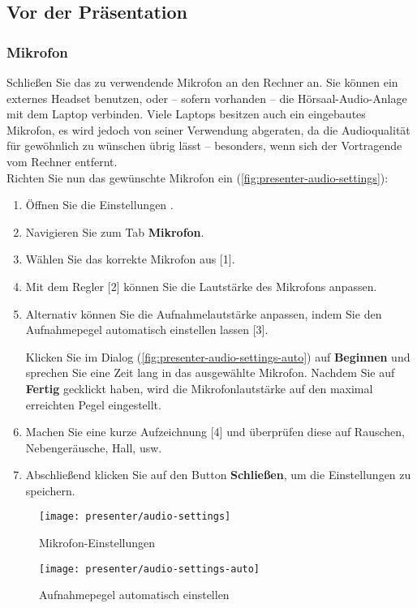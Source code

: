 \subsection*{Vor der Präsentation}

\subsubsection{Mikrofon}
Schließen Sie das zu verwendende Mikrofon an den Rechner an. Sie können ein externes Headset benutzen, oder -- sofern vorhanden -- die Hörsaal-Audio-Anlage mit dem Laptop verbinden.
Viele Laptops besitzen auch ein eingebautes Mikrofon, es wird jedoch von seiner Verwendung abgeraten, da die Audioqualität für gewöhnlich zu wünschen übrig lässt -- besonders, wenn sich der Vortragende vom Rechner entfernt.
\\
Richten Sie nun das gewünschte Mikrofon ein (\autoref{fig:presenter-audio-settings}):
\begin{enumerate}
	\item Öffnen Sie die Einstellungen .
	\item Navigieren Sie zum Tab \textbf{Mikrofon}.
	\item Wählen Sie das korrekte Mikrofon aus [1].
	\item Mit dem Regler [2] können Sie die Lautstärke des Mikrofons anpassen.
	\item Alternativ können Sie die Aufnahmelautstärke anpassen, indem Sie den Aufnahmepegel automatisch einstellen lassen [3].
	
	Klicken Sie im Dialog (\autoref{fig:presenter-audio-settings-auto}) auf \textbf{Beginnen} und sprechen Sie eine Zeit lang in das ausgewählte Mikrofon. Nachdem Sie auf \textbf{Fertig} gecklickt haben, wird die Mikrofonlautstärke auf den maximal erreichten Pegel eingestellt.

	\item Machen Sie eine kurze Aufzeichnung [4] und überprüfen diese auf Rauschen, Nebengeräusche, Hall, usw.
	\item Abschließend klicken Sie auf den Button \textbf{Schließen}, um die Einstellungen zu speichern.
\end{enumerate}

\begin{figure}[H]
	\texttt{[image: presenter/audio-settings]}
	\caption{Mikrofon-Einstellungen}
	\label{fig:presenter-audio-settings}
\end{figure}
\begin{figure}[H]
	\texttt{[image: presenter/audio-settings-auto]}
	\caption{Aufnahmepegel automatisch einstellen}
	\label{fig:presenter-audio-settings-auto}
\end{figure}

